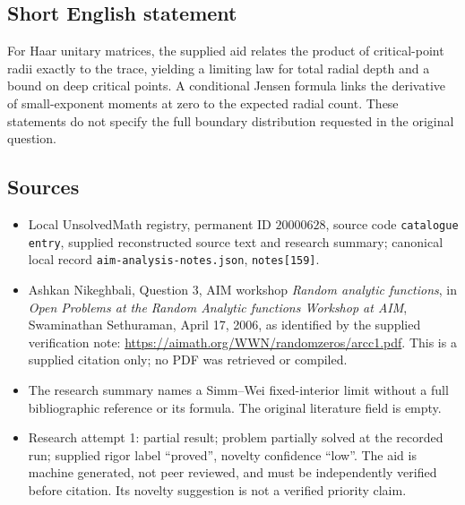 \documentclass[11pt]{article}
\begin{document}
\subsection{Short English statement}
For Haar unitary matrices, the supplied aid relates the product of critical-point radii exactly to the trace, yielding a limiting law for total radial depth and a bound on deep critical points. A conditional Jensen formula links the derivative of small-exponent moments at zero to the expected radial count. These statements do not specify the full boundary distribution requested in the original question.
\subsection{Sources}
\begin{itemize}
\item Local UnsolvedMath registry, permanent ID $20000628$, source code \texttt{catalogue entry}, supplied reconstructed source text and research summary; canonical local record \texttt{aim-analysis-notes.json}, \texttt{notes[159]}.
\item Ashkan Nikeghbali, Question 3, AIM workshop \emph{Random analytic functions}, in \emph{Open Problems at the Random Analytic functions Workshop at AIM}, Swaminathan Sethuraman, April 17, 2006, as identified by the supplied verification note: \url{https://aimath.org/WWN/randomzeros/arcc1.pdf}. This is a supplied citation only; no PDF was retrieved or compiled.
\item The research summary names a Simm--Wei fixed-interior limit without a full bibliographic reference or its formula. The original literature field is empty.
\item Research attempt 1: partial result; problem partially solved at the recorded run; supplied rigor label ``proved'', novelty confidence ``low''. The aid is machine generated, not peer reviewed, and must be independently verified before citation. Its novelty suggestion is not a verified priority claim.
\end{itemize}
\end{document}
